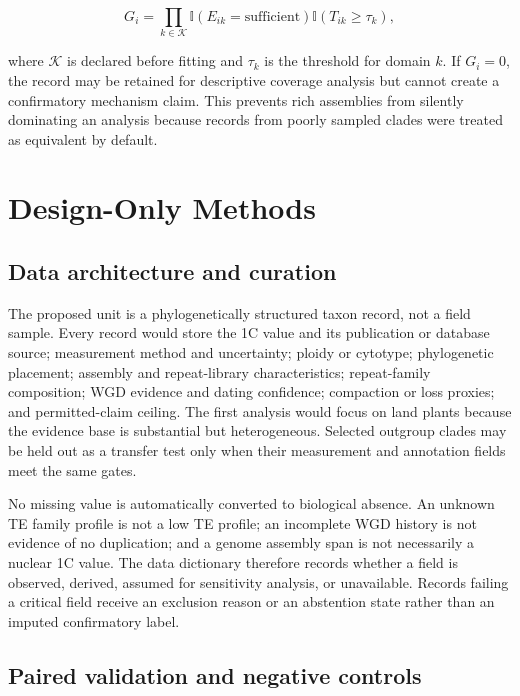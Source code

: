 \documentclass[conference]{IEEEtran}
\begin{document}
\begin{equation}
G_i = \prod_{k\in\mathcal{K}} \mathbb{I}\left(E_{ik}=\mathrm{sufficient}\right)\mathbb{I}\left(T_{ik}\geq\tau_k\right),
\label{eq:gate}
\end{equation}

where $\mathcal{K}$ is declared before fitting and $\tau_k$ is the threshold for domain $k$. If $G_i=0$, the record may be retained for descriptive coverage analysis but cannot create a confirmatory mechanism claim. This prevents rich assemblies from silently dominating an analysis because records from poorly sampled clades were treated as equivalent by default.

\section{Design-Only Methods}

\subsection{Data architecture and curation}

The proposed unit is a phylogenetically structured taxon record, not a field sample. Every record would store the 1C value and its publication or database source; measurement method and uncertainty; ploidy or cytotype; phylogenetic placement; assembly and repeat-library characteristics; repeat-family composition; WGD evidence and dating confidence; compaction or loss proxies; and permitted-claim ceiling. The first analysis would focus on land plants because the evidence base is substantial but heterogeneous. Selected outgroup clades may be held out as a transfer test only when their measurement and annotation fields meet the same gates.

No missing value is automatically converted to biological absence. An unknown TE family profile is not a low TE profile; an incomplete WGD history is not evidence of no duplication; and a genome assembly span is not necessarily a nuclear 1C value. The data dictionary therefore records whether a field is observed, derived, assumed for sensitivity analysis, or unavailable. Records failing a critical field receive an exclusion reason or an abstention state rather than an imputed confirmatory label.

\subsection{Paired validation and negative controls}
\end{document}
